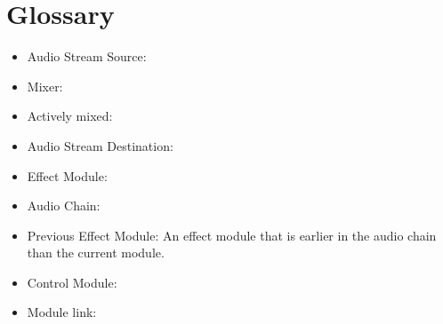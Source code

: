 \chapter{Glossary}

\begin{itemize}
	\item Audio Stream Source:
	\item Mixer:
	\item Actively mixed:
	\item Audio Stream Destination:
	\item Effect Module:
	\item Audio Chain:
	\item Previous Effect Module: An effect module that is earlier in the audio chain than the current module. 
	\item Control Module:
	\item Module link:
\end{itemize}	